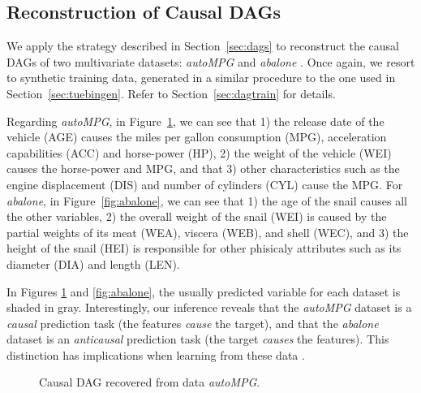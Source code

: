 \documentclass{article}
\begin{document}
\subsection{Reconstruction of Causal DAGs} \label{sec:dags-experiment}

We apply the strategy described in Section~\ref{sec:dags} to reconstruct the
causal DAGs of two multivariate datasets: \emph{autoMPG} and \emph{abalone}
\citep{UCI}. Once again, we resort to synthetic training data, generated in a
similar procedure to the one used in Section~\ref{sec:tuebingen}. Refer to
Section~\ref{sec:dagtrain} for details.

Regarding \emph{autoMPG}, in
Figure~\ref{fig:auto}, we can see that 1) the release date of the vehicle (AGE)
causes the miles per gallon consumption (MPG), acceleration capabilities (ACC)
and horse-power (HP), 2) the weight of the vehicle (WEI) causes the horse-power
and MPG, and that 3) other characteristics such as the engine displacement
(DIS) and number of cylinders (CYL) cause the MPG.  For \emph{abalone}, in
Figure~\ref{fig:abalone}, we can see that 1) the age of the snail causes all
the other variables, 2) the overall weight of the snail (WEI) is caused by the
partial weights of its meat (WEA), viscera (WEB), and shell (WEC), and 3) the
height of the snail (HEI) is responsible for other phisicaly attributes such as
its diameter (DIA) and length (LEN).

In Figures \ref{fig:auto} and \ref{fig:abalone}, the usually predicted variable for 
each dataset is shaded in gray. Interestingly, our inference
reveals that the \emph{autoMPG} dataset is a \emph{causal} prediction task (the
features \emph{cause} the target), and that the \emph{abalone} dataset is an
\emph{anticausal} prediction task (the target \emph{causes} the features). This
distinction has implications when learning from these data \citep{Scholkopf12}.

\begin{figure}[h!]
\begin{center}
\end{center}
\caption{Causal DAG recovered from data \emph{autoMPG}.}
\label{fig:auto}
\end{figure}
\end{document}
